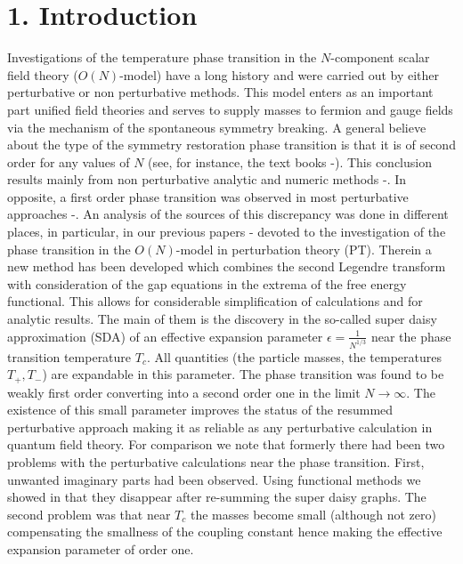 \documentclass[a4paper,12pt]{article}
\begin{document}
\section*{1. Introduction}
Investigations of the temperature phase transition in the
$N$-component scalar field theory ($O(N)$-model) have a long history
and were carried out by either perturbative or non perturbative
methods. This model enters as an important part unified field theories
and serves to supply masses to fermion and gauge fields via the
mechanism of the spontaneous symmetry breaking. A general believe
about the type of the symmetry restoration phase transition is that it
is of second order for any values of $N$ (see, for instance, the text
books \cite{Zinn}-\cite{Kapusta}). This conclusion results mainly from
non perturbative analytic and numeric methods
\cite{Tetradis}-\cite{Fodor}. In opposite, a first order phase
transition was observed in most perturbative approaches
\cite{Takahashi}-\cite{pl}. An analysis of the sources of this
discrepancy was done in different places, in particular, in our
previous papers \cite{Bordag1}-\cite{pl} devoted to the investigation
of the phase transition in the $O(N)$-model in perturbation theory
(PT). Therein a new method has been developed which combines the
second Legendre transform with consideration of the gap equations in
the extrema of the free energy functional. This allows for
considerable simplification of calculations and for analytic results.
The main of them is the discovery in the so-called super daisy
approximation (SDA) of an effective expansion parameter $\epsilon =
\frac{1}{N^{1/3}}$ near the phase transition temperature $T_c$. All
quantities (the particle masses, the temperatures $T_+, T_-$) are
expandable in this parameter. The phase transition was found to be
weakly first order converting into a second order one in the limit $N
\to \infty$. The existence of this small parameter improves the status
of the resummed perturbative approach making it as reliable as any
perturbative calculation in quantum field theory. For comparison we
note that formerly there had been two problems with the perturbative
calculations near the phase transition. First, unwanted imaginary
parts had been observed. Using functional methods we showed in
\cite{Bordag1,pl} that they disappear after re-summing the super daisy
graphs. The second problem was that near $T_c$ the masses become small
(although not zero) compensating the smallness of the coupling
constant hence making the effective expansion parameter of order one.
\end{document}
